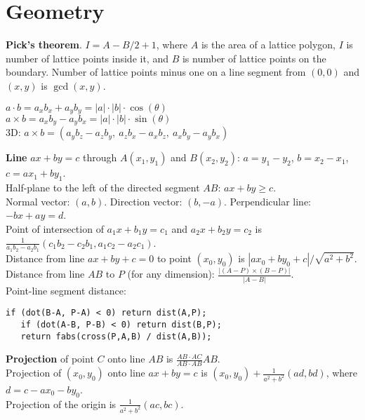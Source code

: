 \documentclass[a4paper, 12pt]{article}
\let\ge=\geqslant
\newcommand{\Section}[1]{
  \section*{#1}
  \addcontentsline{toc}{subsection}{#1}
  \vspace{-3mm}
}
\newcommand{\Topic}[1]{\textbf{#1}}
\begin{document}


\Section{Geometry}

\Topic{Pick's theorem}.
$I = A - B/2 + 1$, where $A$ is the area of a lattice polygon,
$I$ is number of lattice points inside it, and
$B$ is number of lattice points on the boundary.
Number of lattice points minus one on a line segment from $(0, 0)$
and $(x, y)$ is $\gcd(x, y)$.

$a \cdot b = a_x b_x + a_y b_y = |a| \cdot |b| \cdot \cos(\theta)$ \\
$a \times b = a_x b_y - a_y b_x = |a| \cdot |b| \cdot \sin(\theta)$ \\
3D: $a \times b = (a_y b_z - a_z b_y,\ a_z b_x - a_x b_z,\ a_x b_y - a_y b_x)$

\Topic{Line} $ax+by=c$ through $A(x_1, y_1)$ and $B(x_2, y_2)$:
$a=y_1 - y_2$, $b = x_2 - x_1$, $c=ax_1+by_1$. \\
Half-plane to the left of the directed segment $AB$: $ax + by \ge c$. \\
Normal vector: $(a, b)$. Direction vector: $(b, -a)$.
Perpendicular line: $-bx + ay = d$. \\
Point of intersection of $a_1 x + b_1 y = c_1$ and $a_2 x + b_2 y = c_2$ is
$\frac{1}{a_1 b_2 - a_2 b_1} (c_1 b_2 - c_2 b_1, a_1 c_2 - a_2 c_1)$. \\
Distance from line $ax+by+c=0$ to point $(x_0, y_0)$ is
$|a x_0 + b y_0 + c| / \sqrt{a^2 + b^2}$. \\ %
Distance from line $AB$ to $P$ (for any dimension): $\frac{|(A-P) \times (B-P)|}{|A-B|}$. \\
Point-line segment distance:
\vspace{-6mm}
\begin{Verbatim}[fontsize=\small]
   if (dot(B-A, P-A) < 0) return dist(A,P);
   if (dot(A-B, P-B) < 0) return dist(B,P);
   return fabs(cross(P,A,B) / dist(A,B));    
\end{Verbatim}
\vspace{-3mm}

\Topic{Projection} of point $C$ onto line $AB$ is
$\frac{AB \cdot AC}{AB \cdot AB} AB$. \\
Projection of $(x_0, y_0)$ onto line $ax+by=c$ is
$(x_0, y_0) + \frac{1}{a^2 + b^2}(ad, bd)$, where $d = c - ax_0 - by_0$. \\
Projection of the origin is $\frac{1}{a^2 + b^2}(ac, bc)$.
\end{document}

